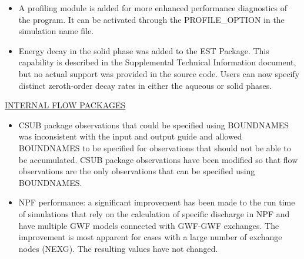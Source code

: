 \begin{itemize}
	\item A profiling module is added for more enhanced performance diagnostics of the program. It can be activated through the PROFILE\_OPTION in the simulation name file.
	\item Energy decay in the solid phase was added to the EST Package.  This capability is described in the Supplemental Technical Information document, but no actual support was provided in the source code.  Users can now specify distinct zeroth-order decay rates in either the aqueous or solid phases.
\end{itemize}

\underline{INTERNAL FLOW PACKAGES}
\begin{itemize}
	\item CSUB package observations that could be specified using BOUNDNAMES was inconsistent with the input and output guide and allowed BOUNDNAMES to be specified for observations that should not be able to be accumulated. CSUB package observations have been modified so that flow observations are the only observations that can be specified using BOUNDNAMES.
	\item NPF performance: a significant improvement has been made to the run time of simulations that rely on the calculation of specific discharge in NPF and have multiple GWF models connected with GWF-GWF exchanges. The improvement is most apparent for cases with a large number of exchange nodes (NEXG). The resulting values have not changed.
\end{itemize}






